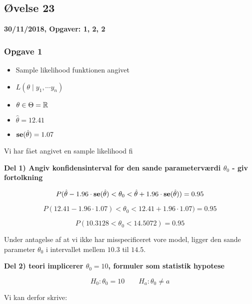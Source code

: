 \horizline

\subsection{Øvelse 23}

\textbf{30/11/2018, Opgaver: 1, 2, 2}

\subsubsection{Opgave 1}


\begin{itemize}
    \item Sample likelihood funktionen angivet
    \item $L(\theta \mid y_1, \cdots y_n)$
    \item $\theta \in \Theta = \mathbb{R}$
    \item $\hat{\theta} =12.41 $
    \item $\textbf{se}(\hat{\theta}) = 1.07$
\end{itemize}

Vi har fået angivet en sample likelihood fi

\textbf{Del 1) Angiv konfidensinterval for den sande parameterværdi $\theta_0$ - giv fortolkning}

\begin{equation}
    P(\hat{\theta} - 1.96\cdot\textbf{se}(\hat{\theta}) < \theta_0 < \hat{\theta} + 1.96\cdot\textbf{se}(\hat{\theta})) = 0.95
\end{equation}

\begin{equation}
    P(12.41 - 1.96\cdot 1.07) < \theta_0 < 12.41 + 1.96\cdot1.07) = 0.95
\end{equation}

\begin{equation}
    P(10.3128 < \theta_0 < 14.5072 )= 0.95
\end{equation}

Under antagelse af at vi ikke har misspecificeret vore model, ligger den sande parameter $\theta_0$ i intervallet mellem $10.3$ til $14.5$.

\textbf{Del 2) teori implicerer $\theta_0 = 10$, formuler som statistik hypotese}

\begin{equation}
    H_0 : \theta_0 = 10\qquad H_a : \theta_0 \neq a
\end{equation}

Vi kan derfor skrive:

